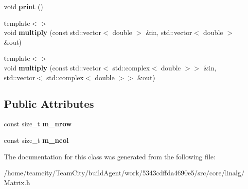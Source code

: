 \begin{DoxyCompactItemize}
\item 
void {\bfseries print} ()\hypertarget{classMatrix_ad13471b4c864eec5335ad1eb70cb85f4}{}\label{classMatrix_ad13471b4c864eec5335ad1eb70cb85f4}

\item 
{\footnotesize template$<$$>$ }\\void {\bfseries multiply} (const std\+::vector$<$ double $>$ \&in, std\+::vector$<$ double $>$ \&out)\hypertarget{classMatrix_a7da3fe02761b32256e4a3755b6d239bd}{}\label{classMatrix_a7da3fe02761b32256e4a3755b6d239bd}

\item 
{\footnotesize template$<$$>$ }\\void {\bfseries multiply} (const std\+::vector$<$ std\+::complex$<$ double $>$$>$ \&in, std\+::vector$<$ std\+::complex$<$ double $>$$>$ \&out)\hypertarget{classMatrix_af007910c5b46bc0961bcb8a7bfcb630c}{}\label{classMatrix_af007910c5b46bc0961bcb8a7bfcb630c}

\end{DoxyCompactItemize}
\subsection*{Public Attributes}
\begin{DoxyCompactItemize}
\item 
const size\+\_\+t {\bfseries m\+\_\+nrow}\hypertarget{classMatrix_a54ae236dc2566f2aaa755e70b35652e5}{}\label{classMatrix_a54ae236dc2566f2aaa755e70b35652e5}

\item 
const size\+\_\+t {\bfseries m\+\_\+ncol}\hypertarget{classMatrix_a4be715e69ee6a708b1bf2693203b4ef7}{}\label{classMatrix_a4be715e69ee6a708b1bf2693203b4ef7}

\end{DoxyCompactItemize}


The documentation for this class was generated from the following file\+:\begin{DoxyCompactItemize}
\item 
/home/teamcity/\+Team\+City/build\+Agent/work/5343cdffda4690e5/src/core/linalg/Matrix.\+h\end{DoxyCompactItemize}
